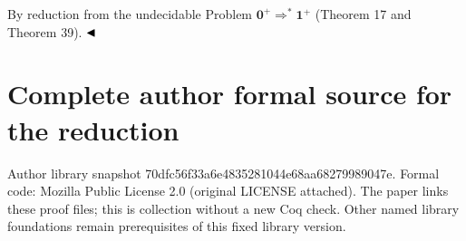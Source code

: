 \documentclass[10pt,a4paper]{amsart}
\begin{document}
 
By reduction from the undecidable Problem $\mathbf{0}^{+}\Rightarrow^{*}\mathbf{1}^{+}$ (Theorem 17 and Theorem 39). $\hfill\blacktriangleleft$\par
 
 
 
 

\clearpage
\section*{Complete author formal source for the reduction}
Author library snapshot 70dfc56f33a6e4835281044e68aa68279989047e. Formal code: Mozilla Public License 2.0 (original LICENSE attached). The paper links these proof files; this is collection without a new Coq check. Other named library foundations remain prerequisites of this fixed library version.
\end{document}
